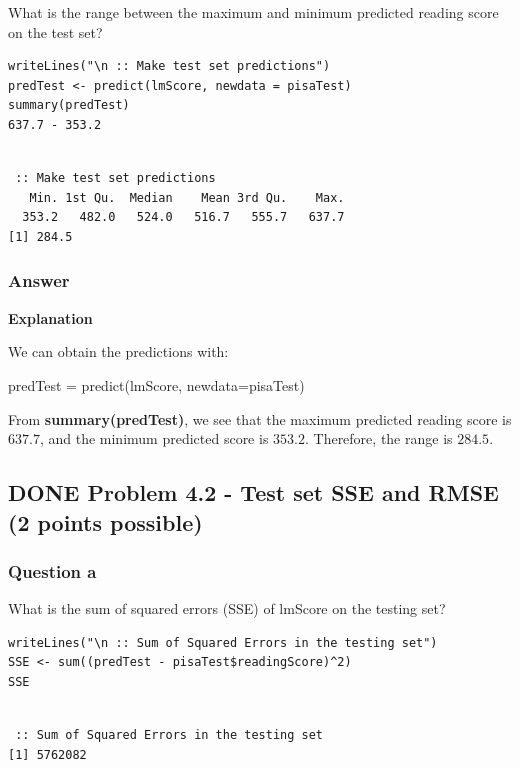 \documentclass[letterpaper, 9pt, onecolumn, twoside, technote, final]{IEEEtran}
\begin{document}
What is the range between the maximum and minimum predicted reading
score on the test set?

\begin{verbatim}
writeLines("\n :: Make test set predictions")
predTest <- predict(lmScore, newdata = pisaTest)
summary(predTest)
637.7 - 353.2
\end{verbatim}

\begin{verbatim}

 :: Make test set predictions
   Min. 1st Qu.  Median    Mean 3rd Qu.    Max.
  353.2   482.0   524.0   516.7   555.7   637.7
[1] 284.5
\end{verbatim}

\subsubsection{Answer}
\label{sec-2-13-1}

\textbf{Explanation}

We can obtain the predictions with:

predTest = predict(lmScore, newdata=pisaTest)

From \textbf{summary(predTest)}, we see that the maximum predicted reading
score is $637.7$, and the minimum predicted score is $353.2$. Therefore,
the range is $284.5$.

\subsection{{\bfseries\sffamily DONE} Problem 4.2 - Test set SSE and RMSE (2 points possible)}
\label{sec-2-14}

\subsubsection{Question a}
\label{sec-2-14-1}

What is the sum of squared errors (SSE) of lmScore on the testing set?

\begin{verbatim}
writeLines("\n :: Sum of Squared Errors in the testing set")
SSE <- sum((predTest - pisaTest$readingScore)^2)
SSE
\end{verbatim}

\begin{verbatim}

 :: Sum of Squared Errors in the testing set
[1] 5762082
\end{verbatim}
\end{document}
